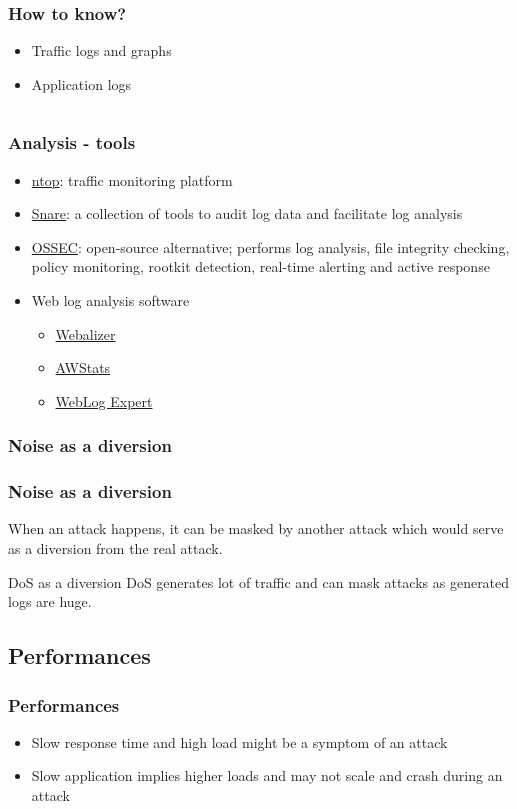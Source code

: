 \begin{frame}
\frametitle{How to know?}
\begin{itemize}
\item Traffic logs and graphs
\item Application logs
\end{itemize}
\begin{columns}
\begin{column}{0.5\textwidth}
\end{column}
\begin{column}{0.5\textwidth}
\end{column}
\end{columns}
\end{frame}

\begin{frame}
\frametitle{Analysis - tools}
\begin{itemize}
\item \href{http://www.ntop.org/products/ntop/}{ntop}: traffic monitoring
platform
\item \href{http://www.intersectalliance.com}{Snare}: a collection of tools to
audit log data and facilitate log analysis
\item \href{http://www.ossec.net/}{OSSEC}: open-source alternative; performs
log analysis, file integrity checking, policy monitoring, rootkit detection,
real-time alerting and active response
\item Web log analysis software
	\begin{itemize}
	\item \href{http://www.webalizer.org/}{Webalizer}
	\item \href{http://awstats.sourceforge.net/}{AWStats}
	\item \href{http://www.weblogexpert.com/}{WebLog Expert}
	\end{itemize}
\end{itemize}
\end{frame}

\subsubsection{Noise as a diversion}

\begin{frame}
\frametitle{Noise as a diversion}
When an attack happens, it can be masked by another attack which would serve
as a diversion from the real attack.
\begin{exampleblock}{DoS as a diversion}
DoS generates lot of traffic and can mask attacks as generated logs are huge.
\end{exampleblock}
\end{frame}

\subsection{Performances}

\begin{frame}
\frametitle{Performances}
\begin{itemize}
\item Slow response time and high load might be a symptom of an attack
\item Slow application implies higher loads and may not scale and crash during
	an attack
\end{itemize}
\end{frame}

